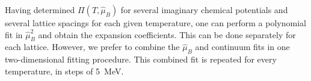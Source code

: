 \documentclass[aps,prd,twocolumn,superscriptaddress]{revtex4-2}
\newcommand \hmu {\hat{\mu}}
\newcommand{\MeV}{\, {\rm MeV}}
\begin{document}
Having determined $\Pi(T,\hmu_B)$ for several imaginary chemical
potentials and several lattice spacings for each given temperature,
one can perform a polynomial fit in $\hmu_B^2$ and obtain the
expansion coefficients.  This can be done separately for each lattice. 
However, we prefer to combine the $\hmu_B$ and continuum fits in one
two-dimensional fitting procedure. This combined fit is repeated for
every temperature, in steps of 5~MeV.


%

\end{document}
